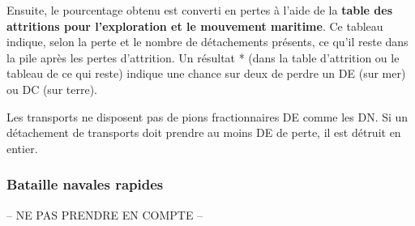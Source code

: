 %

Ensuite, le pourcentage obtenu est converti en pertes à l'aide de
la \textbf{table des attritions pour l'exploration et le mouvement maritime}.
Ce tableau indique, selon la perte et le nombre de détachements présents,
ce qu'il reste dans la pile après les pertes d'attrition. Un résultat * (dans la table
d'attrition ou le tableau de ce qui reste) indique une chance sur deux de perdre un DE
(sur mer) ou DC (sur terre).

Les transports ne disposent pas de pions fractionnaires DE comme les DN.
Si un détachement de transports doit prendre au moins DE de perte,
il est détruit en entier.


\subsubsection{Bataille navales rapides}
-- NE PAS PRENDRE EN COMPTE --

